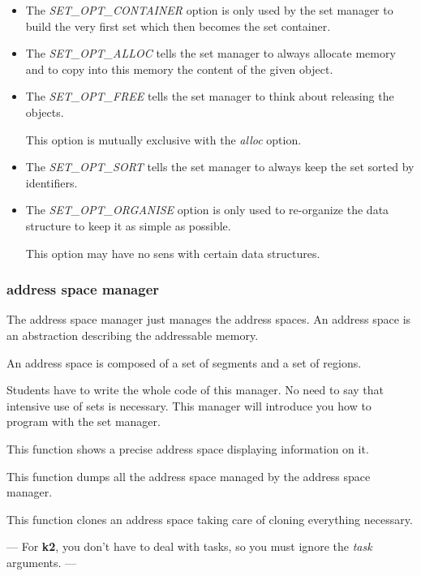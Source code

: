 \begin{itemize}
  \item
    The \textit{SET\_OPT\_CONTAINER} option is only used by the set
    manager to build the very first set which then becomes the set
    container.
  \item
    The \textit{SET\_OPT\_ALLOC} tells the set manager to always allocate
    memory and to copy into this memory the content of the given object.
  \item
    The \textit{SET\_OPT\_FREE} tells the set manager to think about
    releasing the objects.

    This option is mutually exclusive with the \textit{alloc} option.
  \item
    The \textit{SET\_OPT\_SORT} tells the set manager to always keep
    the set sorted by identifiers.
  \item
    The \textit{SET\_OPT\_ORGANISE} option is only used to re-organize
    the data structure to keep it as simple as possible.

    This option may have no sens with certain data structures.
\end{itemize}

%
%

\subsubsection{address space manager}

The address space manager just manages the address spaces. An address
space is an abstraction describing the addressable memory.

An address space is composed of a set of segments and a set of regions.

Students have to write the whole code of this manager. No need to say
that intensive use of  sets is necessary. This manager will introduce
you how to program with the set manager.

	  {This function shows a precise address space displaying information
	    on it.}

	  {This function dumps all the address space managed by the address
	    space manager.}

	  {This function clones an address space taking care of cloning
	    everything necessary.

	    ---
	    For \textbf{k2}, you don't have to deal with tasks, so you must
	    ignore the \textit{task} arguments.
	    ---}


